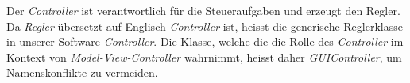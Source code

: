 Der  \emph{Controller}   ist  verantwortlich  f\"ur  die   Steueraufgaben  und
erzeugt    den    Regler. Da    \emph{Regler}   \"ubersetzt    auf    Englisch
\emph{Controller} ist, heisst die  generische Reglerklasse in unserer Software
\emph{Controller}. Die  Klasse, welche  die  die  Rolle des  \emph{Controller}
im   Kontext   von   \emph{Model-View-Controller}  wahrnimmt,   heisst   daher
\emph{GUIController}, um Namenskonflikte zu vermeiden.
